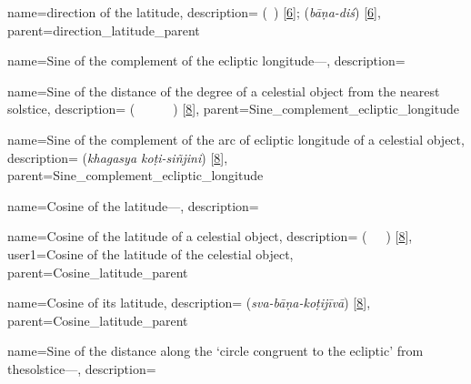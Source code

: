 {
        name={direction of the latitude},
        description={ (\jahat\idafaconsonant\ \ard) [\hyperlink{PEpass6}{6}];  (\textit{bāṇa-diś}) [\hyperlink{SEpass6}{6}]},
        parent={direction_latitude_parent}
} 

{
        name={Sine of the complement of the ecliptic longitude---},
        description={\phantom{x}\nopagebreak}
}

{
        name={Sine of the distance of the degree of a celestial object from the nearest \mbox{solstice}},
        description={ (\jayb\idafaconsonant\ \bud\idafaconsonant\ \daraji\idafavowel\ \kawkab\ \az\ \inqilab\idafaconsonant\ \aqrab) [\hyperlink{PEpass8}{8}]},
        parent={Sine_complement_ecliptic_longitude}
}

{
        name={Sine of the complement of the arc of ecliptic longitude of a celestial object},
        description={\newline{} (\textit{khagasya koṭi-siñjini}) [\hyperlink{SEpass8}{8}]},
        parent={Sine_complement_ecliptic_longitude}
}        

{
        name={Cosine of the latitude---},
        description={\phantom{x}\nopagebreak}
}
        
{
        name={Cosine of the latitude of a celestial object},
        description={ (\jayb\idafaconsonant\ \tamam\idafaconsonant\ \ard\idafaconsonant\ \kawkab) [\hyperlink{PEpass8}{8}]},
        user1={Cosine of the latitude of the celestial object},
        parent={Cosine_latitude_parent}
}

{
        name={Cosine of its latitude},
        description={ (\textit{sva-bāṇa-koṭijīvā}) [\hyperlink{SEpass8}{8}]},
        parent={Cosine_latitude_parent}
}

{
        name={Sine of the distance along the `circle congruent to the ecliptic' from the\linebreak solstice---},
        description={\phantom{x}\nopagebreak}
} 

